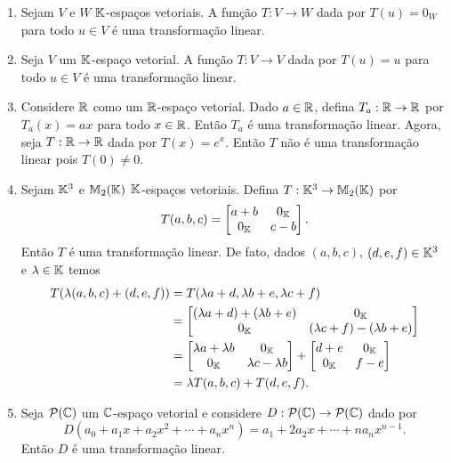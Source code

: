 \begin{exemplo}
	\begin{enumerate}
		\item Sejam $V$ e $W$ $\mathbb{K}$-espaços vetoriais. A função $T : V \to W$ dada por $T(u) = 0_W$ para todo $u \in V$ é uma transformação linear.
		
		\item Seja $V$ um $\mathbb{K}$-espaço vetorial. A função $T : V \to V$ dada por $T(u) = u$ para todo $u \in V$ é uma transformação linear.
		
		\item Considere $\mathbb{R}$ como um $\mathbb{R}$-espaço vetorial. Dado $a \in \mathbb{R}$, defina $T_a : \mathbb{R} \to \mathbb{R}$ por $T_a(x) = ax$ para todo $x \in \mathbb{R}$. Então $T_a$ é uma transformação linear. Agora, seja $T : \mathbb{R} \to \mathbb{R}$ dada por $T(x) = e^x$. Então $T$ não é uma transformação linear pois $T(0) \ne 0$.
		
		\item Sejam $\mathbb{K}^3$ e $\mathbb{M}_2(\mathbb{K})$ $\mathbb{K}$-espaços vetoriais. Defina $T : \mathbb{K}^3 \to \mathbb{M}_2(\mathbb{K})$ por
		\[
			T(a, b, c) = \begin{bmatrix}
				a+b & 0_{\mathbb{K}}\\
				0_{\mathbb{K}} & c - b
			\end{bmatrix}.
		\]
		Então $T$ é uma transformação linear. De fato, dados $(a, b, c)$, $(d, e, f) \in \mathbb{K}^3$ e $\lambda \in \mathbb{K}$ temos
		\begin{align*}
			T(\lambda(a,b,c) + (d,e,f)) &= T(\lambda a + d, \lambda b + e, \lambda c + f) \\ &= \begin{bmatrix}
				(\lambda a + d) + (\lambda b + e) & 0_{\mathbb{K}}\\
				0_{\mathbb{K}} & (\lambda c + f) - (\lambda b + e)
			\end{bmatrix} \\ &= \begin{bmatrix}
				\lambda a + \lambda b & 0_{\mathbb{K}}\\
				0_{\mathbb{K}} & \lambda c - \lambda b
			\end{bmatrix} + \begin{bmatrix}
				d + e & 0_{\mathbb{K}}\\
				0_{\mathbb{K}} & f - e
			\end{bmatrix} \\ &= \lambda T(a,b,c) + T(d,e,f).
		\end{align*}

		\item Seja $\mathcal{P}(\mathbb{C})$ um $\mathbb{C}$-espaço vetorial e considere $D : \mathcal{P}(\mathbb{C}) \to \mathcal{P}(\mathbb{C})$ dado por
		\[
			D(a_0 + a_1x + a_2x^2 + \cdots + a_nx^n) = a_1 + 2a_2x + \cdots + na_nx^{n-1}.
		\]
		Então $D$ é uma transformação linear.


\end{enumerate}
\end{exemplo}
